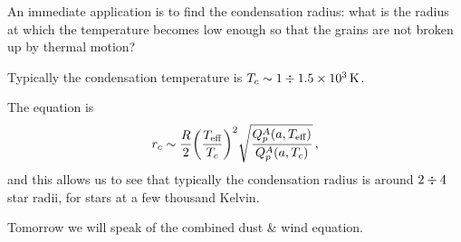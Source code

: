 \documentclass[main.tex]{subfiles}
\begin{document}
An immediate application is to find the condensation radius: what is the radius at which the temperature becomes low enough so that the grains are not broken up by thermal motion? 

Typically the condensation temperature is \(T_c \sim 1 \divisionsymbol  \SI{1.5e3}{K} \). 

The equation is 
%
\begin{align}
  r_c \sim \frac{R}{2} \qty(\frac{T _{\text{eff}}}{T_c})^2
  \sqrt{\frac{Q^{A}_p (a, T _{\text{eff}})}{Q^{A}_p (a,  T_c)}}
\,,
\end{align}
%
and this allows us to see that typically the condensation radius is around \(2 \divisionsymbol 4\) star radii, for stars at a few thousand Kelvin.

Tomorrow we will speak of the combined dust \& wind equation. 
\end{document}
